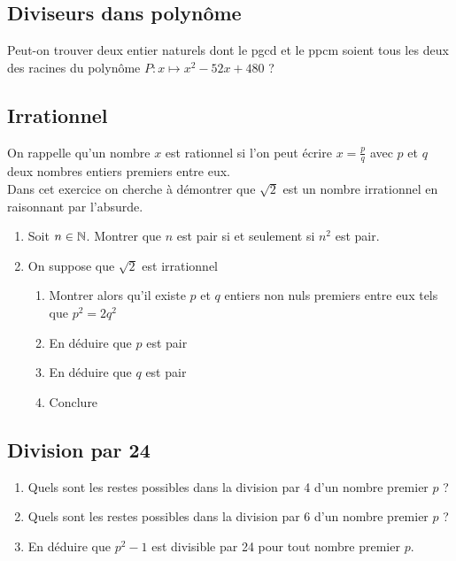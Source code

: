 \documentclass[oneside,12pt]{book}          %
\begin{document}
\subsection{Diviseurs dans polynôme}
Peut-on trouver deux entier naturels dont le pgcd et le ppcm soient tous les deux des racines du polynôme $P:x\mapsto x^2-52x+480$ ?



\subsection{Irrationnel}
On rappelle qu'un nombre $x$ est rationnel si l'on peut écrire $x=\frac{p}{q}$ avec $p$ et $q$ deux nombres entiers premiers entre eux.\\
Dans cet exercice on cherche à démontrer que $\sqrt{2}$ est un nombre irrationnel en raisonnant par l'absurde.

\begin{enumerate}
    \item Soit ${n\in\mathbb N}$. Montrer que $n$ est pair si et seulement si $n^2$ est pair.
    \item On suppose que $\sqrt{2}$ est irrationnel
    \begin{enumerate}
        \item Montrer alors qu'il existe $p$ et $q$ entiers non nuls premiers entre eux tels que $p^2=2q^2$
        \item En déduire que $p$ est pair
        \item En déduire que $q$ est pair
        \item Conclure
    \end{enumerate}
\end{enumerate}



\subsection{Division par 24}
\begin{enumerate}
    \item Quels sont les restes possibles dans la division par 4 d'un nombre premier $p$ ?
    \item Quels sont les restes possibles dans la division par 6 d'un nombre premier $p$ ?
    \item En déduire que $p^2-1$ est divisible par 24 pour tout nombre premier $p$.
\end{enumerate}
\end{document}
